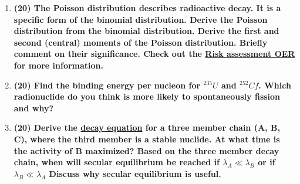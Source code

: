 \documentclass[11pt,a4paper]{article}
\begin{document}
\begin{enumerate}[leftmargin=*,topsep=0pt,font=\bfseries]
    \item\textbf{(20) The Poisson distribution describes radioactive decay. It is a specific form of the binomial distribution. Derive the Poisson distribution from the binomial distribution. Derive the first and second (central) moments of the Poisson distribution. Briefly comment on their significance. Check out the \href{https://courses.lumenlearning.com/uidaho-riskassessment/chapter/common-statistical-distributions/}{Risk assessment OER} for more information.}
        \vspace{0.25in}\\












        
        
        
        
        \newpage
    \item\textbf{(20) Find the binding energy per nucleon for $^{235}U$ and $^{252}Cf$. Which radionuclide do you think is more likely to spontaneously fission and why?}
        \vspace{0.25in}\\
        
        
        
        
        
        
        
        
        
        
        
        
        
        
        
        \newpage
    \item\textbf{(20) Derive the \href{https://courses.lumenlearning.com/uidaho-nuclear/chapter/radioactive-decay/}{decay equation} for a three member chain (A, B, C), where the third member is a stable nuclide. At what time is the activity of B maximized? Based on the three member decay chain, when will secular equilibrium be reached if $\lambda_A \ll \lambda_B$ or if $\lambda_B \ll \lambda_A$ Discuss why secular equilibrium is useful.}
        \vspace{0.25in}\\
        
        
        
        
        

\end{enumerate}
\end{document}

